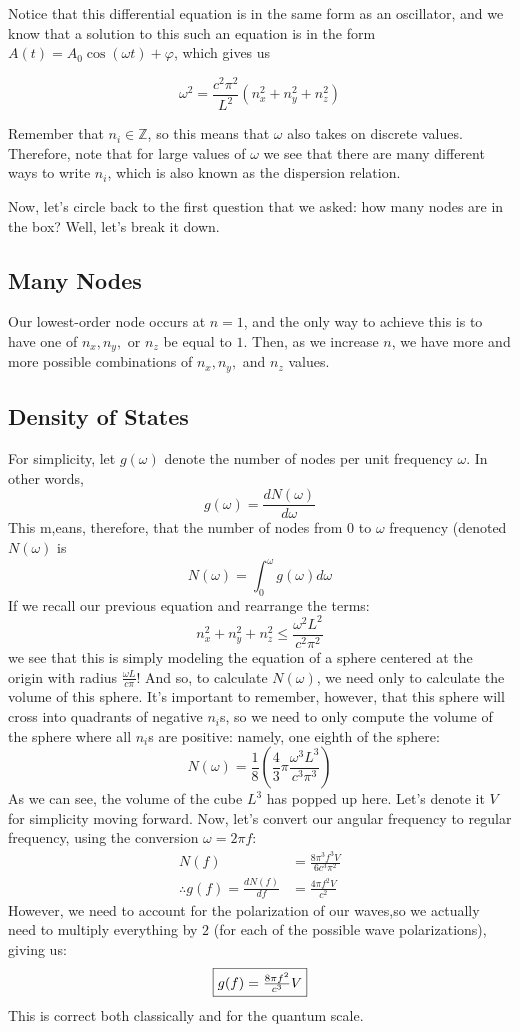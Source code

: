        Notice that this differential equation is in the same form as an oscillator, and we know that a solution to this such an equation is in the form $A(t) = A_0 \cos(\omega t) + \varphi$, which gives us

        \[ \omega^2 = \frac{c^2\pi^2}{L^2}(n_x^2 + n_y^2 + n_z^2) \]

        Remember that $n_i \in \mathbb Z$, so this means that $\omega$ also takes on discrete values. Therefore, note that for large values of $\omega$ we see that there are many different ways to write $n_i$, which is also known as the dispersion relation.

        Now, let's circle back to the first question that we asked: how many nodes are in the box? Well, let's break it down.

      \subsection{Many Nodes}
        Our lowest-order node occurs at $n=1$, and the only way to achieve this is to have one of $n_x,n_y,$ or $n_z$ be equal to $1$. Then, as we increase $n$, we have more and more possible combinations of $n_x,n_y,$ and $n_z$ values.

      \subsection{Density of States}
        For simplicity, let $g(\omega)$ denote the number of nodes per unit frequency $\omega$.  In other words,
        $$g(\omega) = \frac{dN(\omega)}{d\omega}$$
        This m,eans, therefore, that the number of nodes from $0$ to $\omega$ frequency (denoted $N(\omega)$ is $$N(\omega) = \int_0^{\omega}g(\omega)d\omega$$
        If we recall our previous equation and rearrange the terms:
        $$n_x^2 + n_y^2 + n_z^2 \leq \frac{\omega^2L^2}{c^2\pi^2}$$
        we see that this is simply modeling the equation of a sphere centered at the origin with radius $\frac{\omega L}{c\pi}$! And so, to calculate $N(\omega)$, we need only to calculate the volume of this sphere. It's important to remember, however, that this sphere will cross into quadrants of negative $n_i$s, so we need to only compute the volume of the sphere where all $n_i$s are positive: namely, one eighth of the sphere:
        $$N(\omega) = \frac18\left(\frac43\pi\frac{\omega^3L^3}{c^3\pi^3}\right)$$
        As we can see, the volume of the cube $L^3$ has popped up here. Let's denote it $V$ for simplicity moving forward. Now, let's convert our angular frequency to regular frequency, using the conversion $\omega = 2\pi f$:
        \begin{align*}
          N(f) &= \frac{8\pi^3f^3V}{6c^3\pi^2}\\
          \therefore g(f) = \frac{dN(f)}{df} &= \frac{4\pi f^2V}{c^2}
        \end{align*}
        However, we need to account for the polarization of our waves,so we actually need to multiply everything by $2$ (for each of the possible wave polarizations), giving us:
        $$\fbox{$g(f) = \frac{8\pi f^2}{c^3}V$}$$
        This is correct both classically and for the quantum scale.

